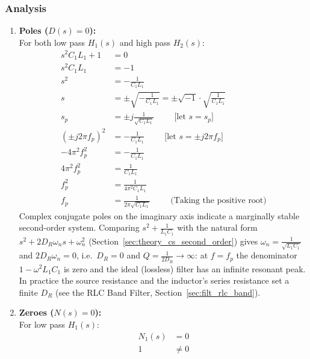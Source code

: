 \subsubsection{Analysis}
\begin{enumerate}
  \item \textbf{Poles (\(D(s) = 0\)):} \\
    For both low pass \(H_1(s)\) and high pass \(H_2(s)\):
    \begin{align*}
      s^2C_1L_1 + 1 &= 0 \\
      s^2C_1L_1 &= -1 \\
      s^2 &= -\frac{1}{C_1L_1} \\
      s &= \pm \sqrt{-\frac{1}{C_1L_1}} = \pm \sqrt{-1} \cdot \sqrt{\frac{1}{C_1L_1}} \\
      s_p &= \pm j \frac{1}{\sqrt{C_1L_1}} \hspace{1cm} \text{[let \(s = s_p\)]} \\
      (\pm j 2 \pi f_p)^2 &= -\frac{1}{C_1L_1} \hspace{1cm} \text{[let \(s = \pm j 2 \pi f_p\)]} \\
      -4 \pi^2 f_p^2 &= -\frac{1}{C_1L_1} \\
      4 \pi^2 f_p^2 &= \frac{1}{C_1L_1} \\
      f_p^2 &= \frac{1}{4 \pi^2 C_1L_1} \\
      f_p &= \frac{1}{2 \pi \sqrt{C_1L_1}} \hspace{1cm} \text{(Taking the positive root)}
    \end{align*}
    Complex conjugate poles on the imaginary axis indicate
    a marginally stable second-order system. Comparing
    \(s^2 + \frac{1}{L_1C_1}\) with the natural form
    \(s^2 + 2D_R\omega_n s + \omega_n^2\) (Section~\ref{sec:theory_cs_second_order})
    gives \(\omega_n = \frac{1}{\sqrt{L_1C_1}}\) and \(2D_R\omega_n = 0\), i.e.\
    \(D_R = 0\) and \(Q = \frac{1}{2D_R} \to \infty\): at \(f = f_p\) the
    denominator \(1 - \omega^2 L_1C_1\) is zero and the ideal (lossless)
    filter has an infinite resonant peak. In practice the source resistance
    and the inductor's series resistance set a finite \(D_R\) (see the RLC
    Band Filter, Section~\ref{sec:filt_rlc_band}).
  \item \textbf{Zeroes (\(N(s) = 0\)):} \\
    For low pass \(H_1(s)\):
    \begin{align*}
        N_1(s) &= 0 \\
        1 &\neq 0
    \end{align*}

\end{enumerate}
